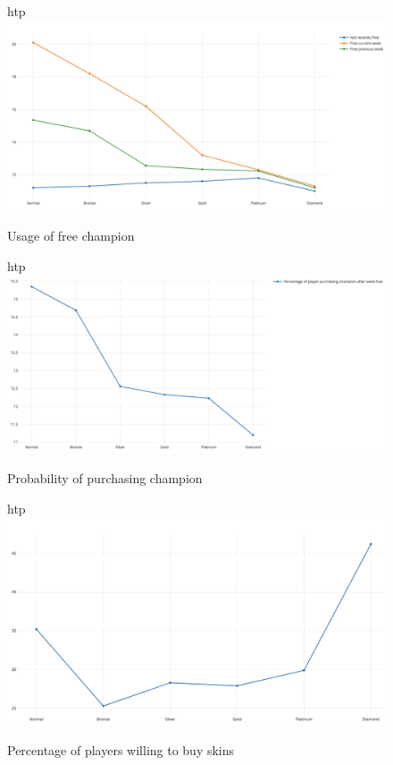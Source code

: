 \documentclass[sigconf]{acmart}
\begin{document}


\begin{figure}{htp}
\centering
\includegraphics[width=1.0\textwidth]{images/WechatIMG112.jpeg}
\caption{Usage of free champion}
\label{Figure 1}
\end{figure}
\begin{figure}{htp}
\centering
\includegraphics[width=1.0\textwidth]{images/WechatIMG114.jpeg}
\caption{Probability of purchasing champion}
\label{Figure 2}
\end{figure}
\begin{figure}{htp}
\centering
\includegraphics[width=1.0\textwidth]{images/WechatIMG115.jpeg}
\caption{Percentage of players willing to buy skins}
\label{Figure 3}
\end{figure}
% 
\end{document}
